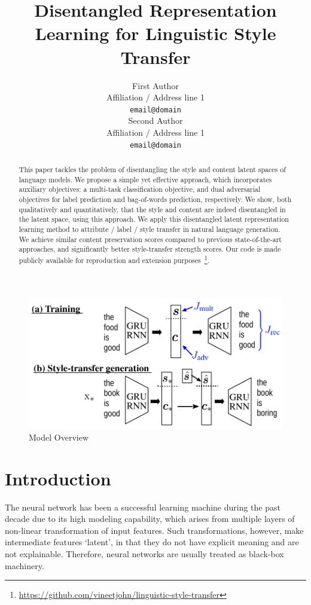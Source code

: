 \documentclass[11pt,a4paper]{article}
\title{Disentangled Representation Learning for Linguistic Style Transfer}
\author{First Author \\
  Affiliation / Address line 1 \\
  {\tt email@domain} \\\And
  Second Author \\
  Affiliation / Address line 1 \\
  {\tt email@domain} \\}
\date{}
\begin{document}
\maketitle

\graphicspath{{images/}}


\begin{abstract}
	This paper tackles the problem of disentangling the style and content latent spaces of language models. We propose a simple yet effective approach, which incorporates auxiliary objectives: a multi-task classification objective, and dual adversarial objectives for label prediction and bag-of-words prediction, respectively. We show, both qualitatively and quantitatively, that the style and content are indeed disentangled in the latent space, using this approach. We apply this disentangled latent representation learning method to attribute / label / style transfer in natural language generation. We achieve similar content preservation scores compared to previous state-of-the-art approaches, and significantly better style-transfer strength scores. Our code is made publicly available for reproduction and extension purposes~\footnote{\tiny{\url{https://github.com/vineetjohn/linguistic-style-transfer}}}.
\end{abstract}

% 

\begin{figure}[ht]
	\centering
	\includegraphics[width=0.9\linewidth]{model-overview}
	\caption{Model Overview}
	\label{fig:model-overview}
\end{figure}

\section{Introduction}

The neural network has been a successful learning machine during the past decade due to its high modeling capability, which arises from multiple layers of non-linear transformation of input features. Such transformations, however, make intermediate features `latent', in that they do not have explicit meaning and are not explainable. Therefore, neural networks are usually treated as black-box machinery.
\end{document}
